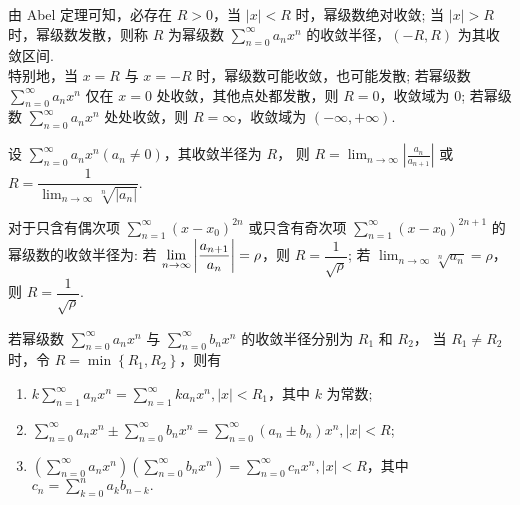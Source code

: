 \begin{definition}[收敛半径与收敛区间]
    由 Abel 定理可知，必存在 $ R>0 $，当 $ |x|<R $ 时，幂级数绝对收敛; 当 $ |x|>R $ 时，幂级数发散，则称 $ R $ 为幂级数 $\displaystyle \sum_{n=0}^{\infty} a_{n} x^{n} $ 的收敛半径，$(-R, R) $ 为其收敛区间.\\
    特别地，当 $ x=R $ 与 $ x=-R $ 时，幂级数可能收敛，也可能发散;
    若幂级数 $\displaystyle \sum_{n=0}^{\infty} a_{n} x^{n} $ 仅在 $ x=0 $ 处收敛，其他点处都发散，则 $ R=0 $，收敛域为 $ \qty{0}$;
    若幂级数 $\displaystyle \sum_{n=0}^{\infty} a_{n} x^{n} $ 处处收敛，则 $ R=\infty $，收敛域为 $ (-\infty,+\infty) $.
\end{definition}

\begin{theorem}
    设 $\displaystyle \sum_{n=0}^{\infty} a_{n} x^{n}\left(a_{n} \neq 0\right) $，其收敛半径为 $ R $，
    则 $\displaystyle  R=\lim _{n \rightarrow \infty}\left|\frac{a_{n}}{a_{n+1}}\right| $ 或 $\displaystyle R=\dfrac{1}{\displaystyle\lim _{n \rightarrow \infty} \sqrt[n]{\left|a_{n}\right|}} .$
\end{theorem}

\begin{theorem}[奇偶次项幂级数的收敛半径]
    对于只含有偶次项 $\displaystyle\sum_{n=1}^{\infty}(x-x_0)^{2n}$ 或只含有奇次项 $\displaystyle\sum_{n=1}^{\infty}(x-x_0)^{2n+1}$ 的幂级数的收敛半径为:
    若 $\displaystyle\lim_{n\to\infty}\qty|\dfrac{a_{n+1}}{a_n}|=\rho$，则 $R=\dfrac{1}{\sqrt{\rho}}$; 若 $\displaystyle\lim_{n\to\infty}\sqrt[n]{a_n}=\rho$，则 $R=\dfrac{1}{\sqrt{\rho}}.$
\end{theorem}

\begin{theorem}[幂级数的运算性质]
    若幂级数 $\displaystyle \sum_{n=0}^{\infty} a_{n} x^{n} $ 与 $\displaystyle \sum_{n=0}^{\infty} b_{n} x^{n} $ 的收敛半径分别为 $ R_{1} $ 和 $ R_{2} $，
    当 $ R_{1} \neq R_{2} $ 时，令 $ R   =\min \left\{R_{1},R_{2}\right\} $，则有
    \begin{enumerate}[label=(\arabic{*})]
        \item $\displaystyle k \sum_{n=1}^{\infty} a_{n} x^{n}=\sum_{n=1}^{\infty} k a_{n} x^{n},|x|<R_{1} $，其中 $ k $ 为常数;
        \item $\displaystyle \sum_{n=0}^{\infty} a_{n} x^{n} \pm \sum_{n=0}^{\infty} b_{n} x^{n}=\sum_{n=0}^{\infty}\left(a_{n} \pm b_{n}\right) x^{n},|x|<R $;
        \item $\displaystyle \left(\sum_{n=0}^{\infty} a_{n} x^{n}\right)\left(\sum_{n=0}^{\infty} b_{n} x^{n}\right)=\sum_{n=0}^{\infty} c_{n} x^{n},|x|<R $，其中 $\displaystyle c_{n}=\sum_{k=0}^{n} a_{k} b_{n-k} .$
    \end{enumerate}
\end{theorem}

